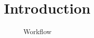\section{Introduction}

\begin{figure}[h!]
    \begin{center}
        
    \end{center}
    \caption{Workflow}
\end{figure}
  
